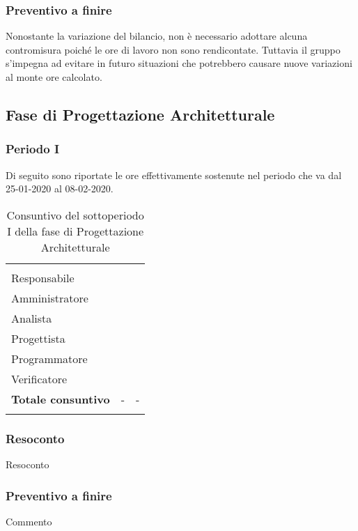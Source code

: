 \subsubsection{Preventivo a finire}
Nonostante la variazione del bilancio, non è necessario adottare alcuna contromisura poiché le ore di lavoro non sono rendicontate. Tuttavia il gruppo s'impegna ad evitare in futuro situazioni che potrebbero causare nuove variazioni al monte ore calcolato.

\subsection{Fase di Progettazione Architetturale}

\subsubsection{Periodo I}

Di seguito sono riportate le ore effettivamente sostenute nel periodo che va dal 25-01-2020 al 08-02-2020.

\begin{longtable}{ C{4cm} C{3cm} C{3.5cm}} 
 	 &
 	 &
 	 \\
 	
 	Responsabile &  & \\
 	Amministratore &  & \\
 	Analista & & \\
 	Progettista & & \\
 	Programmatore & &\\
 	Verificatore & & \\
 	
	\hline 	
 	
 	\textbf{Totale consuntivo} &
	- \color{coloreRosso}{\textbf{(+--)}} &
 	- \\	
 	
 	\caption{Consuntivo del sottoperiodo I della fase di Progettazione Architetturale}
\end{longtable}

\vspace{-1cm}

\subsubsection{Resoconto}
Resoconto
\subsubsection{Preventivo a finire}
Commento

